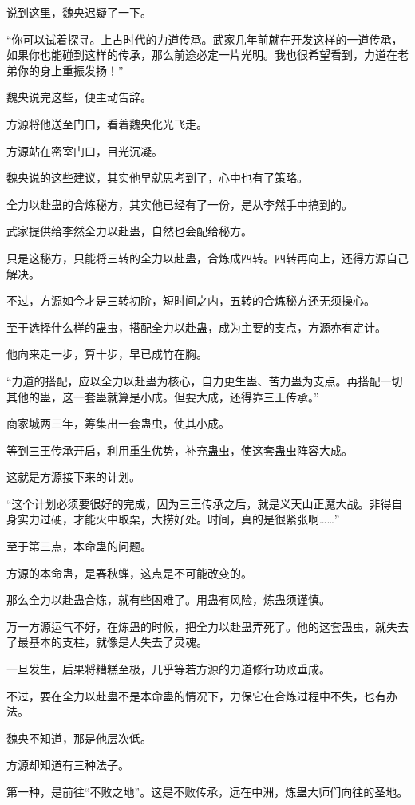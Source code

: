 \begin{this_body}
说到这里，魏央迟疑了一下。

“你可以试着探寻。上古时代的力道传承。武家几年前就在开发这样的一道传承，如果你也能碰到这样的传承，那么前途必定一片光明。我也很希望看到，力道在老弟你的身上重振发扬！”

魏央说完这些，便主动告辞。

方源将他送至门口，看着魏央化光飞走。

方源站在密室门口，目光沉凝。

魏央说的这些建议，其实他早就思考到了，心中也有了策略。

全力以赴蛊的合炼秘方，其实他已经有了一份，是从李然手中搞到的。

武家提供给李然全力以赴蛊，自然也会配给秘方。

只是这秘方，只能将三转的全力以赴蛊，合炼成四转。四转再向上，还得方源自己解决。

不过，方源如今才是三转初阶，短时间之内，五转的合炼秘方还无须操心。

至于选择什么样的蛊虫，搭配全力以赴蛊，成为主要的支点，方源亦有定计。

他向来走一步，算十步，早已成竹在胸。

“力道的搭配，应以全力以赴蛊为核心，自力更生蛊、苦力蛊为支点。再搭配一切其他的蛊，这一套蛊就算是小成。但要大成，还得靠三王传承。”

商家城两三年，筹集出一套蛊虫，使其小成。

等到三王传承开启，利用重生优势，补充蛊虫，使这套蛊虫阵容大成。

这就是方源接下来的计划。

“这个计划必须要很好的完成，因为三王传承之后，就是义天山正魔大战。非得自身实力过硬，才能火中取栗，大捞好处。时间，真的是很紧张啊……”

至于第三点，本命蛊的问题。

方源的本命蛊，是春秋蝉，这点是不可能改变的。

那么全力以赴蛊合炼，就有些困难了。用蛊有风险，炼蛊须谨慎。

万一方源运气不好，在炼蛊的时候，把全力以赴蛊弄死了。他的这套蛊虫，就失去了最基本的支柱，就像是人失去了灵魂。

一旦发生，后果将糟糕至极，几乎等若方源的力道修行功败垂成。

不过，要在全力以赴蛊不是本命蛊的情况下，力保它在合炼过程中不失，也有办法。

魏央不知道，那是他层次低。

方源却知道有三种法子。

第一种，是前往“不败之地”。这是不败传承，远在中洲，炼蛊大师们向往的圣地。


\end{this_body}
